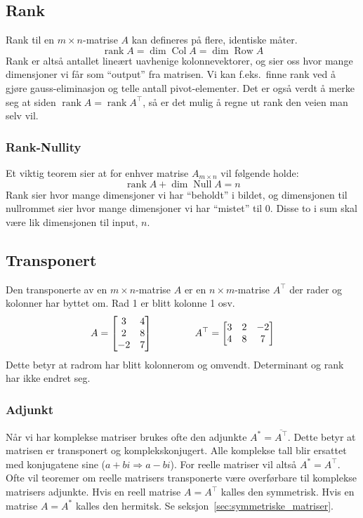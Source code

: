 \documentclass[12pt,a4paper,norsk]{article}
\makeatletter
\newcommand{\mat}[2]{\left[\begin{array}{@{}#1@{}}#2\end{array}\right]}
\DeclareMathOperator{\Col}{Col} %
\DeclareMathOperator{\Row}{Row}
\DeclareMathOperator{\Null}{Null}
\DeclareMathOperator{\rank}{rank}
\makeatother
\begin{document}
\subsection{Rank}
Rank til en $m \times n$-matrise $A$ kan defineres på flere, identiske måter.
\[\rank A = \dim \Col A = \dim \Row A\]
Rank er altså antallet lineært uavhenige kolonnevektorer, og sier oss hvor mange
dimensjoner vi får som ``output'' fra matrisen. Vi kan f.eks.\ finne rank ved å
gjøre gauss-eliminasjon og telle antall pivot-elementer. Det er også verdt å merke seg at
siden $\rank A = \rank A^{\top}$, så er det mulig å regne ut rank den veien man
selv vil.

\subsubsection{Rank-Nullity}\label{sec:rank-nullity}
Et viktig teorem sier at for enhver matrise $A_{m \times n}$ vil følgende holde:
\[\rank A + \dim \Null A = n\]
Rank sier hvor mange dimensjoner vi har ``beholdt'' i bildet, og dimensjonen til nullrommet sier
hvor mange dimensjoner vi har ``mistet'' til 0. Disse to i sum skal være lik
dimensjonen til input, $n$.

\subsection{Transponert}
Den transponerte av en $m \times n$-matrise $A$ er en $n \times m$-matrise $A^{\top}$ der
rader og kolonner har byttet om. Rad 1 er blitt kolonne 1 osv.
\[A = \mat{cc}{3 & 4 \\ 2 & 8 \\ -2 & 7} \hspace{15mm} A^{\top} = \mat{ccc}{3 & 2 & -2 \\ 4 & 8 & 7}\]
Dette betyr at radrom har blitt kolonnerom og omvendt. Determinant og rank har
ikke endret seg.

\subsubsection{Adjunkt}
Når vi har komplekse matriser brukes ofte den adjunkte
$A^{*} = \overline{A^{\top}}$. Dette betyr at matrisen er transponert og
komplekskonjugert. Alle komplekse tall blir ersattet med konjugatene sine ($a+bi
\Rightarrow a-bi$). For reelle matriser vil altså $A^{*} = A^{\top}$. Ofte vil teoremer om
reelle matrisers transponerte være overførbare til komplekse matrisers adjunkte.
Hvis en reell matrise $A = A^{\top}$ kalles den symmetrisk. Hvis en matrise
$A = A^{*}$ kalles den hermitsk. Se seksjon~\ref{sec:symmetriske_matriser}.
\end{document}

